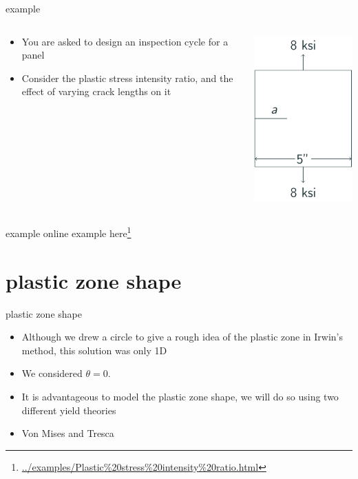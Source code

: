 \documentclass[
  letterpaper,
  ignorenonframetext,
  aspectratio=43,
  handout,
  12pt]{beamer}
\DeclareRobustCommand{\href}[2]{#2\footnote{\url{#1}}}
\providecommand{\tightlist}{%
  \setlength{\itemsep}{0pt}\setlength{\parskip}{0pt}}
\providecommand{\tightlist}{%
\setlength{\itemsep}{0pt}\setlength{\parskip}{0pt}}
\let\Oldincludegraphics\includegraphics
\renewcommand{\includegraphics}[2][]{\Oldincludegraphics[width=\textwidth,height=0.7\textheight,keepaspectratio]{#2}}
\begin{document}
\begin{frame}{example}
\protect\hypertarget{example-1}{}
\begin{columns}[T]
\begin{column}{0.5\textwidth}
\begin{itemize}
\tightlist
\item
  You are asked to design an inspection cycle for a panel
\item
  Consider the plastic stress intensity ratio, and the effect of varying
  crack lengths on it
\end{itemize}
\end{column}

\begin{column}{0.5\textwidth}
\includegraphics{../images/intensity-ratio-example.svg}
\end{column}
\end{columns}
\end{frame}

\begin{frame}{example}
\protect\hypertarget{example-2}{}
online example
\href{../examples/Plastic\%20stress\%20intensity\%20ratio.html}{here}
\end{frame}

\hypertarget{plastic-zone-shape}{%
\section{plastic zone shape}\label{plastic-zone-shape}}

\begin{frame}{plastic zone shape}
\protect\hypertarget{plastic-zone-shape-1}{}
\begin{itemize}
\tightlist
\item
  Although we drew a circle to give a rough idea of the plastic zone in
  Irwin's method, this solution was only 1D
\item
  We considered \(\theta=0\).
\item
  It is advantageous to model the plastic zone shape, we will do so
  using two different yield theories
\item
  Von Mises and Tresca
\end{itemize}
\end{frame}
\end{document}
